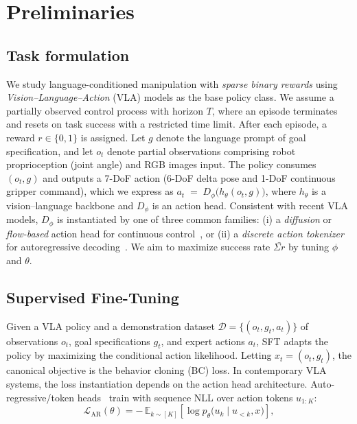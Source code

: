 \section{Preliminaries}
\label{sec: preliminaries}

\subsection{Task formulation}
We study language-conditioned manipulation with \emph{sparse binary rewards} using \emph{Vision--Language--Action} (VLA) models as the base policy class. We assume a partially observed control process with horizon $T$, where an episode terminates and resets on task success with a restricted time limit. After each episode, a reward $r\in\{0,1\}$ is assigned. Let $g$ denote the language prompt of goal specification, and let $o_t$ denote partial observations comprising robot proprioception (\eg joint angle) and RGB images input. The policy consumes $(o_t,g)$ and outputs a 7-DoF action (6-DoF delta pose and 1-DoF continuous gripper command), which we express as $a_t \;=\; D_\phi\!\big(h_\theta(o_t,g)\big)$, 
where $h_\theta$ is a vision--language backbone and $D_\phi$ is an action head. Consistent with recent VLA models, $D_\phi$ is instantiated by one of three common families: (i) a \emph{diffusion} or \emph{flow-based} action head for continuous control~\citep{team2024octo, black2024pi0}, or (ii) a \emph{discrete action tokenizer} for autoregressive decoding~\citep{kim2024openvla, pertsch2025fast}. We aim to maximize success rate $\bar{\Sigma r}$ by tuning $\phi$ and $\theta$. %

\subsection{Supervised Fine-Tuning}
Given a VLA policy and a demonstration dataset
$\mathcal{D}=\{(o_t,g_t,a_t)\}$ of observations $o_t$,
goal specifications $g_t$, and expert actions $a_t$, SFT adapts the policy by maximizing the conditional action likelihood. Letting $x_t=(o_t,g_t)$, the canonical objective is the behavior cloning (BC) loss.
In contemporary VLA systems, the loss instantiation depends on the action head architecture. Auto-regressive/token heads~\citep{kim2024openvla, pertsch2025fast} train with sequence NLL over
action tokens $u_{1:K}$:
\[
\mathcal{L}_{\text{AR}}(\theta)
= - \,\mathbb{E}_{k \sim [K]}\!\left[\log p_{\theta}\!\big(u_k \mid u_{<k}, x\big)\right],
\]

